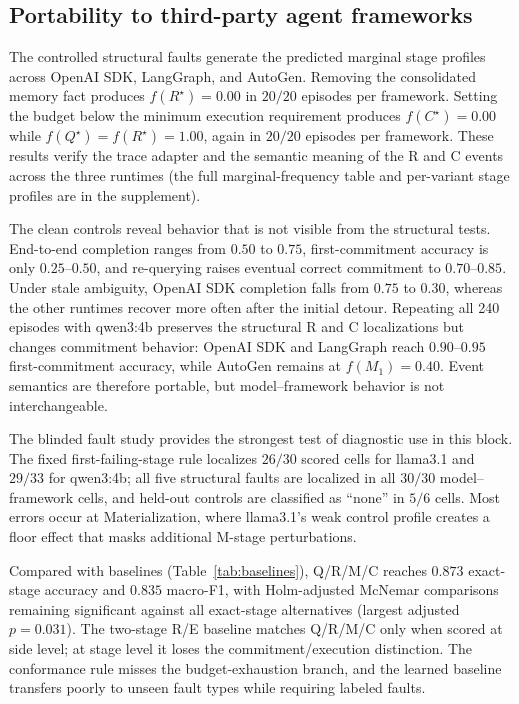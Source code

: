 \documentclass{article}
\begin{document}
\subsection{Portability to third-party agent frameworks}
\label{sec:external}

The controlled structural faults generate the predicted marginal stage profiles across OpenAI SDK, LangGraph, and AutoGen. Removing the consolidated memory fact produces $f(R^\star)=0.00$ in $20/20$ episodes per framework. Setting the budget below the minimum execution requirement produces $f(C^\star)=0.00$ while $f(Q^\star)=f(R^\star)=1.00$, again in $20/20$ episodes per framework. These results verify the trace adapter and the semantic meaning of the R and C events across the three runtimes (the full marginal-frequency table and per-variant stage profiles are in the supplement).

The clean controls reveal behavior that is not visible from the structural tests. End-to-end completion ranges from $0.50$ to $0.75$, first-commitment accuracy is only $0.25$--$0.50$, and re-querying raises eventual correct commitment to $0.70$--$0.85$. Under stale ambiguity, OpenAI SDK completion falls from $0.75$ to $0.30$, whereas the other runtimes recover more often after the initial detour. Repeating all 240 episodes with qwen3:4b preserves the structural R and C localizations but changes commitment behavior: OpenAI SDK and LangGraph reach $0.90$--$0.95$ first-commitment accuracy, while AutoGen remains at $f(M_1)=0.40$. Event semantics are therefore portable, but model--framework behavior is not interchangeable.

The blinded fault study provides the strongest test of diagnostic use in this block. The fixed first-failing-stage rule localizes $26/30$ scored cells for llama3.1 and $29/33$ for qwen3:4b; all five structural faults are localized in all $30/30$ model--framework cells, and held-out controls are classified as ``none'' in $5/6$ cells. Most errors occur at Materialization, where llama3.1's weak control profile creates a floor effect that masks additional M-stage perturbations.

Compared with baselines (Table~\ref{tab:baselines}), Q/R/M/C reaches $0.873$ exact-stage accuracy and $0.835$ macro-F1, with Holm-adjusted McNemar comparisons remaining significant against all exact-stage alternatives (largest adjusted $p=0.031$). The two-stage R/E baseline matches Q/R/M/C only when scored at side level; at stage level it loses the commitment/execution distinction. The conformance rule misses the budget-exhaustion branch, and the learned baseline transfers poorly to unseen fault types while requiring labeled faults.
\end{document}
